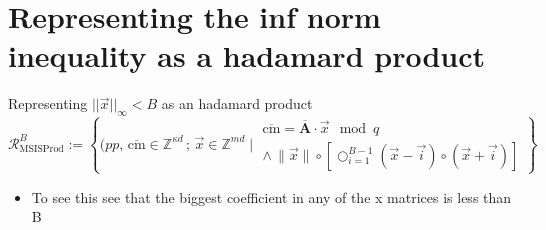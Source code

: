 \section{Representing the inf norm inequality as a hadamard product}
\begin{frame}{Representing $||\overrightarrow{x}||_{\infty} < B$ as an hadamard product}
    \[
        \mathcal{R}^B_{\text{MSISProd}} :=
        \left\{ (pp, \, \overline{\text{cm}} \in \mathbb{Z}^{\kappa d}\, ;\, \overrightarrow{x}  \in \mathbb{Z}^{md} \mid
        \begin{array}{c}
            \overline{\text{cm}} = \overline{\mathbf{A}} \cdot \overrightarrow{x} \mod q \\
            \land \, \| \overrightarrow{x} \| \circ \left[\bigcirc^{B-1}_{i=1} (\overrightarrow{x} - \overrightarrow{i}) \circ (\overrightarrow{x} + \overrightarrow{i}) \right]
        \end{array}
        \right\}
    \]

    \begin{itemize}
        \item To see this see that the biggest coefficient in any of the x matrices is less than B
    \end{itemize}
\end{frame}